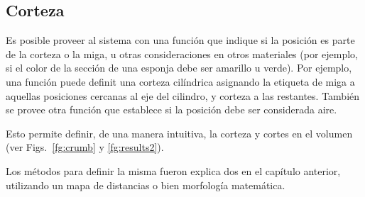 \subsection*{Corteza}
Es posible proveer al sistema con una función que indique si la posición es parte de la corteza o la miga, u otras consideraciones en otros materiales (por ejemplo, si el color de la sección de una esponja debe ser amarillo u verde).
Por ejemplo, una función puede definit una corteza cilíndrica asignando la etiqueta de miga a aquellas posiciones cercanas al eje del cilindro, y corteza a las restantes.
También se provee otra función que establece si la posición debe ser considerada aire.

Esto permite definir, de una manera intuitiva, la corteza y cortes en el volumen (ver Figs.~\ref{fg:crumb} y \ref{fg:results2}).

Los métodos para definir la misma fueron explica
dos en el capítulo anterior, utilizando un mapa de distancias o bien morfología matemática.







